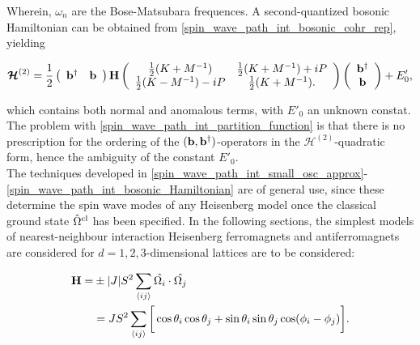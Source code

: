 Wherein, $\omega_n$ are the Bose-Matsubara frequences. A second-quantized bosonic Hamiltonian can be obtained from \cref{spin_wave_path_int_bosonic_cohr_rep}, yielding 

\begin{equation}
    \bm{\mathcal{H}}^{(2)} = \frac{1}{2} \left(\begin{array}{cc}
        {\bf b}^\dagger & {\bf b} 
    \end{array}\right) {\bf H} \left(\begin{array}{cc}
         \frac{1}{2} (K+M^{-1}) & \frac{1}{2} (K+M^{-1}) + iP  \\
         \frac{1}{2} (K-M^{-1}) -iP & \frac{1}{2} (K+M^{-1}).
    \end{array}\right) \left(\begin{array}{c}
        {\bf b}^\dagger \\
        {\bf b} 
    \end{array}\right) + E'_0,
    \label{spin_wave_path_int_bosonic_Hamiltonian}
\end{equation}

which contains both normal and anomalous terms, with $E'_0$ an unknown constat. The problem with \cref{spin_wave_path_int_partition_function} is that there is no prescription for the ordering of the $({\bf b}, {\bf b}^\dagger)$-operators in the $\bm{\mathcal{H}}^{(2)}$-quadratic form, hence the ambiguity of the constant $E'_0$. \\

The techniques developed in \cref{spin_wave_path_int_small_osc_approx}-\cref{spin_wave_path_int_bosonic_Hamiltonian} are of general use, since these determine the spin wave modes of any Heisenberg model once the classical ground state $\hat{\Omega}^{\textnormal{cl}}$ has been specified. In the following sections, the simplest models of nearest-neighbour interaction Heisenberg ferromagnets and antiferromagnets are considered for $d = 1,2,3$-dimensional lattices are to be considered: 

\begin{equation}
    \begin{split}
        {\bf H} =& \pm |J| S^2 \sum_{\langle ij \rangle} \hat{\Omega_i} \cdot \hat{\Omega_j} \\
        &= J S^2 \sum_{\langle ij \rangle} \bigg[ \cos \theta_i \cos \theta_j + \sin \theta_i \sin \theta_j \cos(\phi_i - \phi_j) \bigg].
    \end{split}
    \label{spin_wave_path_integral_Heisenberg_Ham}
\end{equation}

